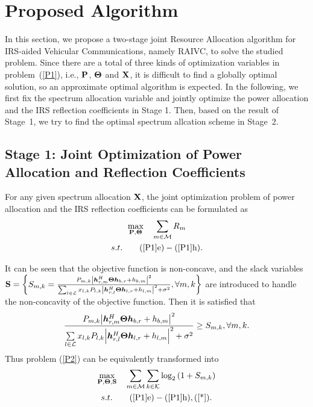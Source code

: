 \documentclass[journal]{IEEEtran}
\begin{document}
\section{Proposed Algorithm}
In this section, we propose a two-stage joint Resource Allocation algorithm for IRS-aided Vehicular Communications, namely RAIVC, to solve the studied problem. Since there are a total of three kinds of optimization variables in problem~(\ref{P1}), i.e., $\bf{P}$, $\bf{\Theta}$ and $\bf{X}$, it is difficult to find a globally optimal solution, so an approximate optimal algorithm is expected. In the following, we first fix the spectrum allocation variable and jointly optimize the power allocation and the IRS reflection coefficients in Stage 1. Then, based on the result of Stage~1, we try to find the optimal spectrum allcation scheme in Stage~2.

\subsection{Stage 1: Joint Optimization of Power Allocation and Reflection Coefficients}
For any given spectrum allocation $\bf{X}$, the joint optimization problem of power allocation and the IRS reflection coefficients can be formulated as
\begin{subequations}\label{P2}
	\begin{gather}
	\mathop {\max }\limits_{{\bf{P}},{\bf{\Theta }}} \quad\sum\limits_{m \in {\cal M}} {{R_m}} \\
	s.t. \qquad (\ref{P1}\rm{e})-(\ref{P1}\rm{h}).
	\end{gather}
\end{subequations}

\noindent It can be seen that the objective function is non-concave, and the slack variables $ {\bf{S}} = \left\{ {{S_{m,k}} = \frac{{{P_{m,k}}{{\left| {\bm{h}_{r,m}^H{\bf{\Theta }}{\bm{h}_{b,r}} + {h_{b,m}}} \right|}^2}}}{{\sum\nolimits_{l \in {\cal L}} {{x_{l,k}}{P_{l,k}}{{\left| {\bm{h}_{r,l}^H{\bf{\Theta }}{\bm{h}_{l,r}} + {h_{l,m}}} \right|}^2}}  + {\sigma ^2}}},\forall m,k} \right\} $ are introduced to handle the non-concavity of the objective function. Then it is satisfied that
\begin{equation}\label{*}
\small
\frac{{{P_{m,k}}{{\left| {\bm{h}_{r,m}^H{\bf{\Theta }}{\bm{h}_{b,r}} + {h_{b,m}}} \right|}^2}}}{{\sum\limits_{l \in {\cal L}} {{x_{l,k}}{P_{l,k}}{{\left| {\bm{h}_{r,l}^H{\bf{\Theta }}{\bm{h}_{l,r}} + {h_{l,m}}} \right|}^2}}  + {\sigma ^2}}} \ge {S_{m,k}},\forall m,k.
\end{equation}
Thus problem (\ref{P2}) can be equivalently transformed into
\begin{subequations}\label{P3}
	\begin{gather}
	\mathop {\max }\limits_{{\bf{P}},{\bf{\Theta }},{\bf{S}}} \quad \sum\limits_{m \in {\cal M}} {\sum\limits_{k \in {\cal K}} {{{\log }_2}\left( {1 + {S_{m,k}}} \right)} } \\
	s.t. \qquad (\ref{P1}\rm{e})-(\ref{P1}\rm{h}),(\ref{*}).
	\end{gather}
\end{subequations}
\end{document}
